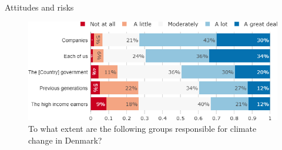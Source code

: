 \documentclass[aspectratio=169,9pt,dvipsnames]{beamer}
\begin{document}

\begin{frame}{Attitudes and risks}%
\begin{figure}[h!]
\centering
\caption{To what extent are the following groups responsible for climate change in Denmark?}
\includegraphics[width=.8\textwidth]{../figures/DK/CC_responsible_DK.png}
\end{figure}
\end{frame}
\end{document}

